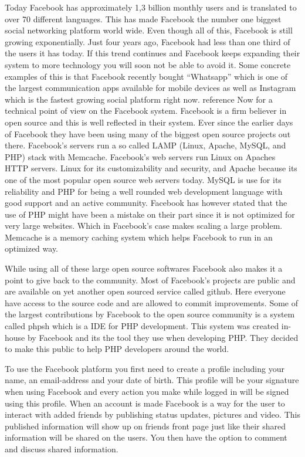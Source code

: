 \documentclass[conference]{IEEEtran}
\begin{document}
Today Facebook has approximately 1,3 billion monthly users and is translated to
over 70 different languages. This has made Facebook the number one biggest
social networking platform world wide. Even though all of this, Facebook is
still growing exponentially. Just four years ago, Facebook had less than one
third of the users it has today. If this trend continues and Facebook keeps
expanding their system to more technology you will soon not be able to avoid
it. Some concrete examples of this is that Facebook recently bought “Whatsapp”
which is one of the largest communication apps available for mobile devices as
well as Instagram which is the fastest growing social platform right now.
reference Now for a technical point of view on the Facebook system. Facebook is
a firm believer in open source and this is well reflected in their system. Ever
since the earlier days of Facebook they have been using many of the biggest
open source projects out there.  Facebook’s servers run a  so called LAMP
(Linux, Apache, MySQL, and PHP) stack with Memcache. Facebook’s web servers run
Linux on Apaches HTTP servers. Linux for its customizability and security, and
Apache because its one of the most popular open source web servers today. MySQL
is use for its reliability and PHP for being a well rounded web development
language with good support and an active community. Facebook has however stated
that the use of PHP might have been a mistake on their part since it is not
optimized for very large websites. Which in Facebook’s case makes scaling a
large problem.  Memcache is a memory caching system which helps Facebook to run
in an optimized way.

While using all of these large open source softwares Facebook also makes it a
point to give back to the community. Most of Facebook’s projects are public and
are available on yet another open sourced service called github. Here everyone
have access to the source code and are allowed to commit improvements. Some of
the largest contributions by Facebook to the open source community is a system
called phpsh which is a IDE for PHP development. This system was created
in-house by Facebook and its the tool they use when developing PHP. They
decided to make this public to help PHP developers around the world. 

To use the Facebook platform you first need to create a profile including your
name, an email-address and your date of birth. This profile will be your
signature when using Facebook and every action you make while logged in will be
signed using this profile.  When an account is made Facebook is a way for the
user to interact with added friends by publishing status updates, pictures and
video. This published information will show up on friends front page just like
their shared information will be shared on the users. You then have the option
to comment and discuss shared information.
\end{document}
